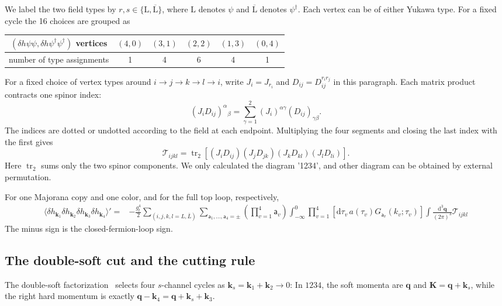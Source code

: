 \documentclass[a4paper,12pt]{article}
\newcommand{\mb}{\mathbf}
\def\aa{\mathsf a}
\newcommand{\di}{\mathrm d}
\newcommand{\tr}{\operatorname{tr}}
\newcommand{\bq}{\mb q}
\newcommand{\bk}{\mb k}
\begin{document}
We label the two field types by $r,s\in\{\mathrm L,\overline{\mathrm L}\}$,
where $\mathrm L$ denotes $\psi$ and $\overline{\mathrm L}$ denotes
$\psi^\dagger$. 
Each vertex can be of either Yukawa type. For a fixed cycle the 16 choices
are grouped as
\begin{center}
\begin{tabular}{c|ccccc}
$(\delta h\psi\psi,
\delta h\psi^\dagger\psi^\dagger)$ vertices
 & $(4,0)$ & $(3,1)$ & $(2,2)$ & $(1,3)$ & $(0,4)$\\\hline
number of type assignments & 1 & 4 & 6 & 4 & 1
\end{tabular}
\end{center}

For a fixed choice of vertex types around $i\to j\to k\to l\to i$,
write $J_i=J_{r_i}$ and $D_{ij}=D^{r_i r_j}_{ij}$
in this paragraph. Each matrix product contracts one spinor index:
\[
 (J_iD_{ij})^\alpha{}_{\beta}
 =\sum_{\gamma=1}^2(J_i)^{\alpha\gamma}(D_{ij})_{\gamma\beta}.
\]
The indices are dotted or undotted according to the field at each
endpoint. Multiplying the four segments and closing the last index
with the first gives
\begin{equation}
 \mathcal T_{ijkl}=
 \tr_2\!\left[(J_iD_{ij})(J_jD_{jk})(J_kD_{kl})(J_lD_{li})\right].
 \label{eq:weyl-components}
\end{equation}
Here $\tr_2$ sums only the two spinor components. 
We only calculated the diagram '1234', and other diagram can be obtained by external permutation.

For one Majorana copy and one color, and for the full top loop, respectively,
\begin{align}
 \langle\delta h_{\bk_1}\delta h_{\bk_2}
 \delta h_{\bk_3}\delta h_{\bk_4}\rangle'={}&-\frac{g_t^4}{2}
 \sum_{(i,j,k,l=L,\bar L)}\sum_{\aa_1,\ldots,\aa_4=\pm}
 \left(\prod_{v=1}^4\aa_v\right)
 \int_{-\infty}^0\prod_{v=1}^4
 [\di\tau_v\,a(\tau_v)G_{\aa_v}(k_v;\tau_v)]
 \int\frac{\di^3\bq}{(2\pi)^3}\mathcal T_{ijkl}
 \label{eq:each-box}
\end{align}
The minus sign is the closed-fermion-loop sign.

\subsection{The double-soft cut and the cutting rule}
\label{sec:soft-branches}
The double-soft factorization~\cite{qin} selects four $s$-channel cycles
as $\bk_s=\bk_1+\bk_2\to0$:
In $1234$, the soft momenta are $\bq$ and
$\mb K=\bq+\bk_s$, while the right hard momentum is exactly
$\bq-\bk_4=\bq+\bk_s+\bk_3$. 
\end{document}
